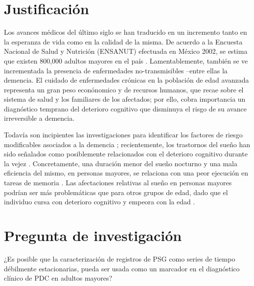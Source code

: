 \documentclass[12pt,a4paper]{mitthesis}
\begin{document}

\section{Justificaci\'on}

Los avances m\'edicos del \'ultimo siglo se han traducido en un incremento tanto en la esperanza de 
vida como en la calidad de la misma. 
De acuerdo a la Encuesta Nacional de Salud y Nutrici\'on (ENSANUT) efectuada en M\'exico 2002, se 
estima que existen 800,000 adultos mayores en el pa\'is \cite{Sosa12}. 
Lamentablemente, tambi\'en se ve incrementada la presencia de enfermedades no-transmisibles --entre 
ellas la demencia. 
El cuidado de enfermedades cr\'onicas en la poblaci\'on de edad avanzada representa un gran peso 
econ\'onomico y de recursos humanos, que recae sobre el sistema de salud y los familiares de los 
afectados; por ello, cobra importancia un diagn\'ostico temprano del deterioro cognitivo que 
disminuya el risgo de su avance irreversible a demencia.

Todav\'ia son incipientes las investigaciones para identificar los factores de riesgo 
modificables asociados a la demencia \cite{PlanAlzheimer04}; recientemente, los trastornos del 
sue\~no han sido se\~nalados como posiblemente relacionados con el deterioro cognitivo durante la 
vejez \cite{Amer13,Miyata13,Potvin12}. Concretamente, una duraci\'on menor del sue\~no nocturno y 
una mala eficiencia del mismo, en personas mayores, se relaciona con una peor ejecuci\'on en tareas 
de memoria \cite{Reid06}. Las afectaciones relativas al sue\~no en personas mayores podr\'ian ser 
m\'as problem\'aticas que para otros grupos de edad, dado que el individuo cursa con deterioro 
cognitivo y empeora con la edad \cite{Potvin12}.


\section{Pregunta de investigaci\'on}

¿Es posible que la caracterizaci\'on de registros de PSG como series de tiempo d\'ebilmente 
estacionarias, pueda ser usada como un marcador en el diagn\'ostico cl\'inico de PDC en adultos 
mayores?
\end{document}
